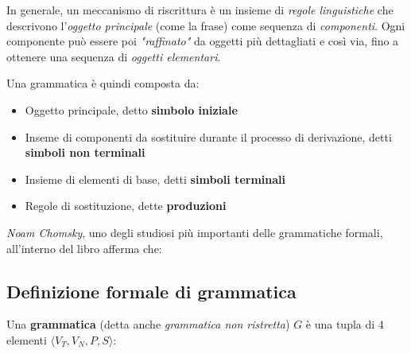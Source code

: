 \documentclass[italian, 10pt]{article}
\begin{document}
\bigskip
In generale, un meccanismo di riscrittura è un insieme di \textit{regole linguistiche} che descrivono l'\textit{oggetto principale} (come la frase) come sequenza di \textit{componenti}.
Ogni componente può essere poi \textit{"raffinato"} da oggetti più dettagliati e così via, fino a ottenere una sequenza di \textit{oggetti elementari}.

Una grammatica è quindi composta da:

\begin{itemize}
  \item Oggetto principale, detto \textbf{simbolo iniziale}
  \item Inseme di componenti da sostituire durante il processo di derivazione, detti \textbf{simboli non terminali}
  \item Insieme di elementi di base, detti \textbf{simboli terminali}
  \item Regole di sostituzione, dette \textbf{produzioni}
\end{itemize}

\bigskip

\textit{Noam Chomsky}, uno degli studiosi più importanti delle grammatiche formali, all'interno del libro  afferma che:



\subsection{Definizione formale di grammatica}

Una \textbf{grammatica} (detta anche \textit{grammatica non ristretta}) \(G\) è una tupla di \(4\) elementi \(\langle V_T, V_N, P, S \rangle\):
\end{document}
